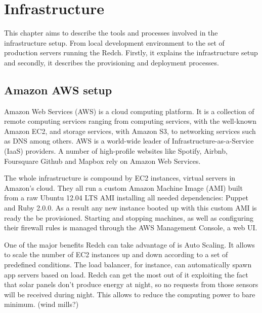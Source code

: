 \chapter{Infrastructure}

This chapter aims to describe the tools and processes involved in the infrastructure setup. From local development environment to the set of production servers running the Redch. Firstly, it explains the infrastructure setup and secondly, it describes the provisioning and deployment processes.

\section{Amazon AWS setup}

Amazon Web Services (AWS) is a cloud computing platform. It is a collection of remote computing services ranging from computing services, with the well-known Amazon EC2, and storage services, with Amazon S3, to networking services such as DNS among others. AWS is a world-wide leader of Infrastructure-as-a-Service (IaaS) providers. A number of high-profile websites like Spotify, Airbnb, Foursquare Github and Mapbox rely on Amazon Web Services.

The whole infrastructure is compound by EC2 instances, virtual servers in Amazon's cloud. They all run a custom Amazon Machine Image (AMI) built from a raw Ubuntu 12.04 LTS AMI installing all needed dependencies: Puppet and Ruby 2.0.0. As a result any new instance booted up with this custom AMI is ready the be provisioned. Starting and stopping machines, as well as configuring their firewall rules is managed through the AWS Management Console, a web UI.

One of the major benefits Redch can take advantage of is Auto Scaling. It allows to scale the number of EC2 instances up and down according to a set of predefined conditions. The load balancer, for instance, can automatically spawn app servers based on load. Redch can get the most out of it exploiting the fact that solar panels don't produce energy at night, so no requests from those sensors will be received during night. This allows to reduce the computing power to bare minimum. (wind mills?)

